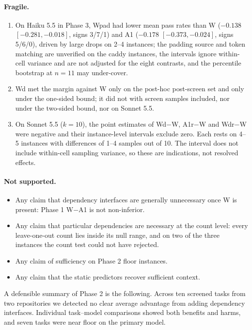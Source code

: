 \paragraph{Fragile.}
\begin{enumerate}
\item On Haiku 5.5 in Phase 3, Wpad had lower mean pass rates than W ($-0.138$ $[-0.281,-0.018]$, signs 3/7/1) and A1 ($-0.178$ $[-0.373,-0.024]$, signs 5/6/0), driven by large drops on 2--4 instances; the padding source and token matching are unverified on the caddy instances, the intervals ignore within-cell variance and are not adjusted for the eight contrasts, and the percentile bootstrap at $n=11$ may under-cover.
\item Wd met the margin against W only on the post-hoc post-screen set and only under the one-sided bound; it did not with screen samples included, nor under the two-sided bound, nor on Sonnet 5.5.
\item On Sonnet 5.5 ($k=10$), the point estimates of Wd$-$W, A1r$-$W and Wdr$-$W were negative and their instance-level intervals exclude zero. Each rests on 4--5 instances with differences of 1--4 samples out of 10. The interval does not include within-cell sampling variance, so these are indications, not resolved effects.
\end{enumerate}

\paragraph{Not supported.}
\begin{itemize}
\item Any claim that dependency interfaces are generally unnecessary once W is present: Phase 1 W$-$A1 is not non-inferior.
\item Any claim that particular dependencies are necessary at the count level: every leave-one-out count lies inside its null range, and on two of the three instances the count test could not have rejected.
\item Any claim of sufficiency on Phase 2 floor instances.
\item Any claim that the static predictors recover sufficient context.
\end{itemize}

A defensible summary of Phase 2 is the following. Across ten screened tasks from two repositories we detected no clear average advantage from adding dependency interfaces. Individual task--model comparisons showed both benefits and harms, and seven tasks were near floor on the primary model.


